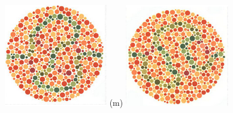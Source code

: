 \documentclass[	12pt, Times, openright, twoside, a4paper, english, brazil]{abntex2}
\begin{document}
\begin{apendicesenv}
\begin{figure}[!htb]
\endminipage\hfill
{}
\centering
{\includegraphics[width=\linewidth]{ishihara-fuga/figureIshihara34.png}}
(m)
\endminipage\hfill
{}
\centering
{\includegraphics[width=\linewidth]{ishihara-fuga/figureIshihara35.png}}

\end{figure}
\end{apendicesenv}
\end{document}
